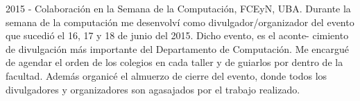 
\item 2015 - Colaboraci\'on en la Semana de la Computaci\'on, FCEyN,
    UBA.
    Durante la semana de la computaci\'on me desenvolv\'i como divulgador/organizador
del evento que sucedi\'o el 16, 17 y 18 de junio del 2015. Dicho evento, es el aconte-
cimiento de divulgaci\'on m\'as importante del Departamento de Computaci\'on. Me
encargu\'e de agendar el orden de los colegios en cada taller y de guiarlos por dentro
de la facultad. Adem\'as organic\'e el almuerzo de cierre del evento, donde todos los
divulgadores y organizadores son agasajados por el trabajo realizado.